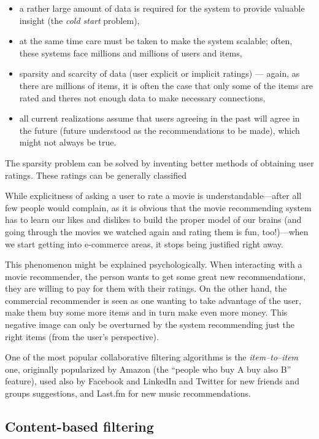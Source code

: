\begin{itemize}
	\item a rather large amount of data is required for the system to provide valuable insight (the \emph{cold start} problem),
	\item at the same time care must be taken to make the system scalable; often, these systems face millions and millions of users and items,
	\item sparsity and scarcity of data (user explicit or implicit ratings) --- again, as there are millions of items, it is often the case that only some of the items are rated and theres not enough data to make necessary connections,
	\item all current realizations assume that users agreeing in the past will agree in the future (future understood as the recommendations to be made), which might not always be true.
\end{itemize}

The sparsity problem can be solved by inventing better methods of obtaining user ratings. These ratings can be generally classified 

While explicitness of asking a user to rate a movie is understandable---after all few people would complain, as it is obvious that the movie recommending system has to learn our likes and dislikes to build the proper model of our brains (and going through the movies we watched again and rating them is fun, too!)---when we start getting into e-commerce areas, it stops being justified right away.

This phenomenon might be explained psychologically. When interacting with a movie recommender, the person wants to get some great new recommendations, they are willing to pay for them with their ratings. On the other hand, the commercial recommender is seen as one wanting to take advantage of the user, make them buy some more items and in turn make even more money. This negative image can only be overturned by the system recommending just the right items (from the user's perspective).

One of the most popular collaborative filtering algorithms is the \emph{item--to--item} one, originally popularized by Amazon (the ``people who buy A buy also B'' feature), used also by Facebook and LinkedIn and Twitter for new friends and groups suggestions, and Last.fm for new music recommendations.

\subsection{Content-based filtering}

